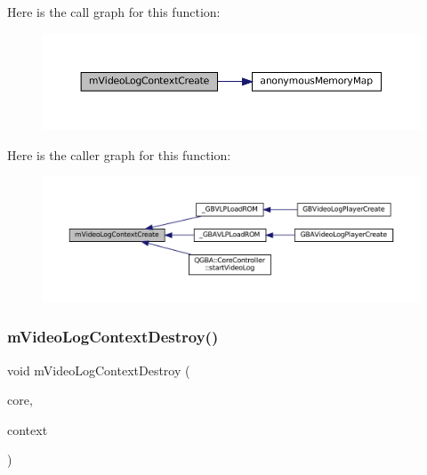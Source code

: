 Here is the call graph for this function\+:
\nopagebreak
\begin{figure}[H]
\begin{center}
\leavevmode
\includegraphics[width=350pt]{video-logger_8c_abfc652080406bf430af299f8ab419aec_cgraph}
\end{center}
\end{figure}
Here is the caller graph for this function\+:
\nopagebreak
\begin{figure}[H]
\begin{center}
\leavevmode
\includegraphics[width=350pt]{video-logger_8c_abfc652080406bf430af299f8ab419aec_icgraph}
\end{center}
\end{figure}
\mbox{\label{video-logger_8c_a300bc3d5849465d59ddaa92e6a338fb6}} 
\subsubsection{\texorpdfstring{m\+Video\+Log\+Context\+Destroy()}{mVideoLogContextDestroy()}}
{\footnotesize\ttfamily void m\+Video\+Log\+Context\+Destroy (\begin{DoxyParamCaption}\item[{struct m\+Core $\ast$}]{core,  }\item[{struct m\+Video\+Log\+Context $\ast$}]{context }\end{DoxyParamCaption})}

